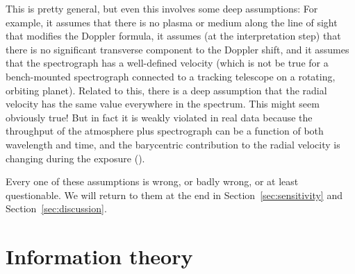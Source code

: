 \documentclass[modern]{aastex631}
\newcommand{\sectionname}{Section}
\newcommand{\secref}[1]{\sectionname~\ref{#1}}
\begin{document}
\begin{description}
    This is pretty general, but even this involves some deep assumptions:
    For example, it assumes that there is no plasma or medium along the line of sight that modifies the Doppler formula,
    it assumes (at the interpretation step) that there is no significant transverse component to the Doppler shift,
    and it assumes that the spectrograph has a well-defined velocity (which is not be true for a bench-mounted spectrograph connected to a tracking telescope on a rotating, orbiting planet).
    Related to this, there is a deep assumption that the radial velocity has the same value everywhere in the spectrum.
    This might seem obviously true!
    But in fact it is weakly violated in real data because the throughput of the atmosphere plus spectrograph can be a function of both wavelength and time, and the barycentric contribution to the radial velocity is changing during the exposure (\citealt{berv-lambda}).
\end{description}
Every one of these assumptions is wrong, or badly wrong, or at least questionable.
We will return to them at the end in \secref{sec:sensitivity} and \secref{sec:discussion}.

\section{Information theory}\label{sec:info}
\end{document}
